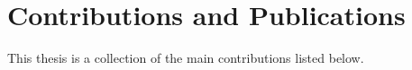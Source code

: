 \section{Contributions and Publications}
\textcolor{red}
{
}

This thesis is a collection of the main contributions listed below.

